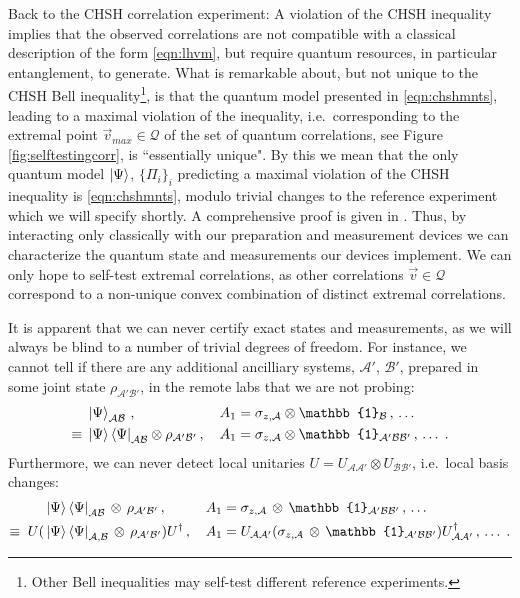 Back to the CHSH correlation experiment: A violation of the CHSH inequality implies that the observed correlations are not compatible with a classical description of the form \ref{eqn:lhvm}, but require quantum resources, in particular entanglement, to generate. What is remarkable about, but not unique to the CHSH Bell inequality\footnote{Other Bell inequalities may self-test different reference experiments.}, is that the quantum model presented in \ref{eqn:chshmnts}, leading to a maximal violation of the inequality, i.e.\ corresponding to the extremal point $\Vec{v}_{max}\in\mathcal{Q}$ of the set of quantum correlations, see Figure \ref{fig:selftestingcorr}, is ``essentially unique". By this we mean that the only quantum model $\ket{\Psi}$, $\{\Pi_i\}_i$ predicting a maximal violation of the CHSH inequality is \ref{eqn:chshmnts}, modulo trivial changes to the reference experiment which we will specify shortly. A comprehensive proof is given in \cite{Supic2020}.
Thus, by interacting only classically with our preparation and measurement devices we can characterize the quantum state and measurements our devices implement. We can only hope to self-test extremal correlations, as other correlations $\Vec{v}\in\mathcal{Q}$ correspond to a non-unique convex combination of distinct extremal correlations. 

It is apparent that we can never certify exact states and measurements, as we will always be blind to a number of trivial degrees of freedom. For instance, we cannot tell if there are any additional ancilliary systems, $\mathcal{A'}$, $\mathcal{B'}$, prepared in some joint state $\rho_{\mathcal{A'B'}}$, in the remote labs that we are not probing:
\begin{align*}
    & \ket{\Psi}_\mathcal{AB}\thinspace,\thinspace && A_{1} = \sigma_{z,\mathcal{A}}\otimes\mathbb{1}_{\mathcal{B}}\thinspace,\thinspace \dots \\
    \equiv\; & \ket{\Psi}\bra{\Psi}_{\mathcal{AB}}\otimes\rho_{\mathcal{A'B'}}\thinspace,\thinspace && A_1 = \sigma_{z,\mathcal{A}}\otimes\mathbb{1}_{\mathcal{A'BB'}}\thinspace,\thinspace\dots\; .
\end{align*}
Furthermore, we can never detect local unitaries $U=U_\mathcal{AA'}\otimes U_\mathcal{BB'}$, i.e.\ local basis changes:
\begin{align*}
    & \ket{\Psi}\bra{\Psi}_{\mathcal{AB}}\thinspace\otimes\thinspace\rho_{\mathcal{A'B'}}\thinspace,\thinspace && A_1 = \sigma_{z,\mathcal{A}}\thinspace\otimes\thinspace\mathbb{1}_{\mathcal{A'BB'}}\thinspace,\thinspace\dots \\ 
    \equiv\;  U(& \ket{\Psi}\bra{\Psi}_{\mathcal{A,B}}\thinspace\otimes\thinspace\rho_{\mathcal{A'B'}})U^{\dag}\thinspace,\thinspace && A_1 = U_{\mathcal{AA'}}(\sigma_{z,\mathcal{A}}\thinspace\otimes\thinspace\mathbb{1}_{\mathcal{A'BB'}})U_{\mathcal{AA'}}^{\dag}\thinspace,\thinspace\dots\; .
\end{align*}

